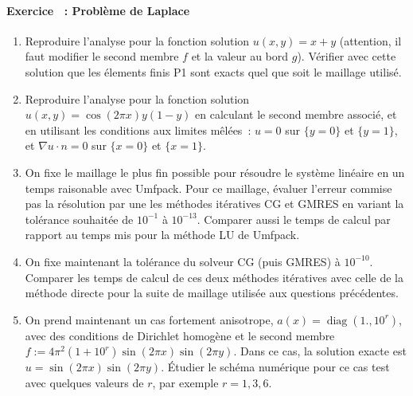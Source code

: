 \documentclass[a4paper,11pt]{article}
\DeclareMathOperator{\diag}{diag}
\newcounter{exerc}[section] %
\newenvironment{exercice}[1]{
  \addtocounter{exerc}{1}
  \paragraph{\bf Exercice~\arabic{exerc} : #1}\hfill\mbox{}\par}{}
\begin{document}
\begin{exercice}{Problème de Laplace}
\begin{enumerate}
    Donner les tableaux de valeurs $\min(u_h(x))$, $\max(u_h(x))$, et
    $\min(u(x))$, $\max(u(x))$. Pour certaines applications, il est
    important de conserver ces $\min$ et $\max$. Que se passe-t-il pour
    notre problème ?

  \item Reproduire l'analyse pour la fonction solution $u(x,y) = x+y$
    (attention, il faut modifier le second membre $f$ et la valeur au
    bord $g$). Vérifier avec cette solution que les élements finis P1
    sont exacts quel que soit le maillage utilisé.

  \item Reproduire l'analyse pour la fonction solution
    $u(x,y) = \cos(2\pi x)y(1-y)$ en calculant le second membre associé, et en
    utilisant les conditions aux limites mêlées~: $u = 0$ sur $\{y=0\}$ et
    $\{y=1\}$, et $\nabla u\cdot n = 0$ sur $\{x=0\}$ et $\{x=1\}$.

  \item On fixe le maillage le plus fin possible pour résoudre le
    système linéaire en un temps raisonable avec Umfpack. Pour ce
    maillage, évaluer l'erreur commise pas la résolution par une les
    méthodes itératives CG et GMRES en variant la tolérance souhaitée de
    $10^{-1}$ à $10^{-13}$. Comparer aussi le temps de calcul par
    rapport au temps mis pour la méthode LU de Umfpack.

  \item On fixe maintenant la tolérance du solveur CG (puis GMRES) à
    $10^{-10}$. Comparer les temps de calcul de ces deux méthodes
    itératives avec celle de la méthode directe pour la suite de
    maillage utilisée aux questions précédentes.

  \item On prend maintenant un cas fortement anisotrope,
    $a(x) = \diag(1.,10^r)$, avec des conditions de Dirichlet homogène
    et le second membre $f := 4\pi^2(1+10^r) \sin(2\pi x)\sin(2\pi
    y)$. Dans ce cas, la solution exacte est
    $u = \sin(2\pi x)\sin(2\pi y)$. Étudier le schéma numérique pour ce
    cas test avec quelques valeurs de $r$, par exemple $r=1,3,6$.

    

  \end{enumerate}

\end{exercice}
\end{document}
